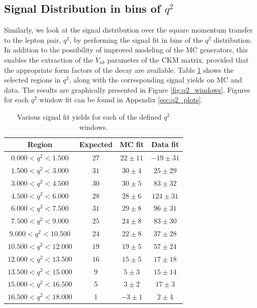 \subsection{Signal Distribution in bins of \texorpdfstring{$q^2$}{q2}}
\label{sec:signal-distribution-in-bins-of-texorpdfstringq2q2}

Similarly, we look at the signal distribution over the square momentum transfer to the lepton pair, $q^2$, by performing the signal fit in bins of the $q^2$ distribution. In addition to the possibility of improved modeling of the MC generators, this enables the extraction of the $V_{ub}$ parameter of the CKM matrix, provided that the appropriate form factors of the decay are available. Table \ref{tab:q2_windows} shows the selected regions in $q^2$, along with the corresponding signal yields on MC and data. The results are graphically presented in Figure \ref{fig:q2_windows}. Figures for each $q^2$ window fit can be found in Appendix \ref{sec:q2_plots}.

\begin{table}[H]
	\centering
	\begin{tabular}{c|c|c|c}
		Region & Expected & MC fit & Data fit \\
		\toprule
		$0.000  < q^2 < 1.500$ & $27$ & $22 \pm 11$ & $-19 \pm 31$ \\
		$1.500  < q^2 < 3.000$ & $31$ & $30 \pm 4$ & $25 \pm 29$ \\
		$3.000  < q^2 < 4.500$ & $30$ & $30 \pm 5$ & $83 \pm 32$ \\
		$4.500  < q^2 < 6.000$ & $28$ & $28 \pm 6$ & $124 \pm 31$ \\
		$6.000  < q^2 < 7.500$ & $31$ & $29 \pm 8$ & $96 \pm 31$ \\
		$7.500  < q^2 < 9.000$ & $25$ & $24 \pm 8$ & $83 \pm 30$ \\
		$9.000  < q^2 < 10.500$ & $24$ & $22 \pm 8$ & $37 \pm 28$ \\
		$10.500  < q^2 < 12.000$ & $19$ & $19 \pm 5$ & $57 \pm 24$ \\
		$12.000  < q^2 < 13.500$ & $16$ & $15 \pm 5$ & $17 \pm 18$ \\
		$13.500  < q^2 < 15.000$ & $9$ & $5 \pm 3$ & $15 \pm 14$ \\
		$15.000  < q^2 < 16.500$ & $5$ & $3 \pm 2$ & $17 \pm 3$ \\
		$16.500  < q^2 < 18.000$ & $1$ & $-3 \pm 1$ & $2 \pm 4$ \\
		\bottomrule
	\end{tabular}
	\captionsetup{width=.8\linewidth}
	\caption{Various signal fit yields for each of the defined $q^2$ windows.}
	\label{tab:q2_windows}
\end{table}

